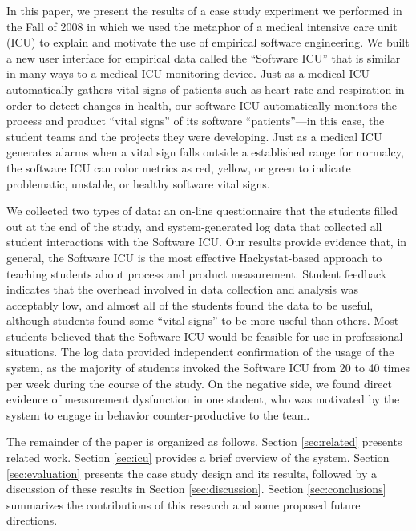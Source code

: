 \documentclass[10pt,twocolumn]{article}
\begin{document}
In this paper, we present the results of a case study experiment we
performed in the Fall of 2008 in which we used the metaphor of a medical
intensive care unit (ICU) to explain and motivate the use of empirical
software engineering.  We built a new user interface for empirical data called
the ``Software ICU'' that is similar in many ways to a medical ICU
monitoring device.  Just as a medical ICU automatically gathers vital signs
of patients such as heart rate and respiration in order to detect changes
in health, our software ICU automatically monitors the process and product
``vital signs'' of its software ``patients''---in this case, the student
teams and the projects they were developing.  Just as a medical ICU
generates alarms when a vital sign falls outside a established range for
normalcy, the software ICU can color metrics as red, yellow, or green to
indicate problematic, unstable, or healthy software vital signs.

We collected two types of data: an on-line questionnaire that the students
filled out at the end of the study, and system-generated log data that
collected all student interactions with the Software ICU.  Our results
provide evidence that, in general, the Software ICU is the most effective
Hackystat-based approach to teaching students about process and product
measurement.  Student feedback indicates that the overhead involved in data
collection and analysis was acceptably low, and almost all of the students
found the data to be useful, although students found some ``vital signs''
to be more useful than others. Most students believed that the Software ICU
would be feasible for use in professional situations.  The log data
provided independent confirmation of the usage of the system, as the
majority of students invoked the Software ICU from 20 to 40 times per week
during the course of the study.  On the negative side, we found direct
evidence of measurement dysfunction in one student, who was motivated by the
system to engage in behavior counter-productive to the team.

The remainder of the paper is organized as follows.  Section
\ref{sec:related} presents related work.  Section \ref{sec:icu} provides a
brief overview of the system. Section \ref{sec:evaluation} presents the
case study design and its results, followed by a discussion of these results
in Section \ref{sec:discussion}.   Section \ref{sec:conclusions} summarizes the 
contributions of this research and some proposed future directions.

\label{sec:related}
\end{document}
